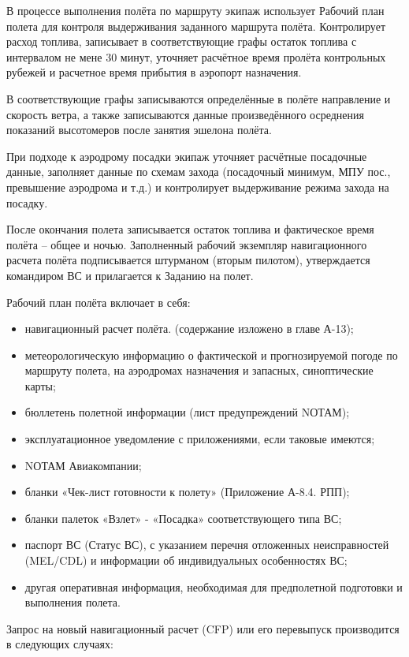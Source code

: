 В процессе выполнения полёта по маршруту экипаж использует Рабочий план полета для контроля выдерживания заданного маршрута полёта. Контролирует расход топлива, записывает в соответствующие графы остаток топлива с интервалом не мене 30 минут, уточняет расчётное время пролёта контрольных рубежей и расчетное время прибытия в аэропорт назначения.

В соответствующие графы записываются определённые в полёте направление и скорость ветра, а также записываются данные произведённого осреднения показаний высотомеров после занятия эшелона полёта.

При подходе к аэродрому посадки экипаж уточняет расчётные посадочные данные, заполняет данные по схемам захода (посадочный минимум, МПУ пос., превышение аэродрома и т.д.) и контролирует выдерживание режима захода на посадку. 

После окончания полета записывается остаток топлива и фактическое время полёта – общее и ночью. Заполненный рабочий экземпляр навигационного расчета полёта подписывается штурманом (вторым пилотом), утверждается командиром ВС и прилагается к Заданию на полет.

Рабочий план полёта включает в себя:
\begin{itemize}
    \item навигационный расчет полёта. (содержание изложено в главе А-13); 
    \item метеорологическую информацию о фактической и прогнозируемой погоде по маршруту полета, на аэродромах назначения и запасных, синоптические карты;
    \item бюллетень полетной информации (лист предупреждений NОТАМ); 
    \item эксплуатационное уведомление с приложениями, если таковые имеются;
    \item NОТАМ Авиакомпании; 
    \item бланки «Чек-лист готовности к полету» (Приложение А-8.4. РПП); 
    \item бланки палеток «Взлет» - «Посадка» соответствующего типа ВС; 
    \item паспорт ВС (Статус ВС), с указанием перечня отложенных неисправностей (MEL/CDL) и информации об индивидуальных особенностях ВС; 
    \item другая оперативная информация, необходимая для предполетной подготовки и выполнения полета.
\end{itemize} 

Запрос на новый навигационный расчет (CFP) или его перевыпуск производится в следующих случаях: 

